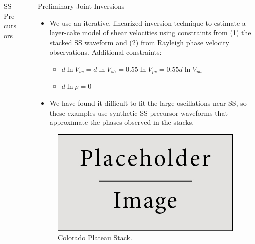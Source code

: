 \documentclass[final]{beamer}
\newlength{\sepwid}
\newlength{\onecolwid}
\newlength{\twocolwid}
\begin{document}
\begin{frame}[t]
\begin{columns}[t]
\begin{column}{\twocolwid}
\begin{columns}[t,totalwidth=\twocolwid]
\begin{column}{\onecolwid}
\begin{block}{SS Precursors}
\end{block}


\end{column} %

\end{columns} %

\end{column} %

\begin{column}{\sepwid}\end{column} %

\begin{column}{\onecolwid} %


\begin{block}{Preliminary Joint Inversions}

\begin{itemize}

\item We use an iterative, linearized inversion technique to estimate a layer-cake model of shear velocities using constraints from (1) the stacked SS waveform and (2) from Rayleigh phase velocity observations.  Additional constraints:

	\begin{itemize}

	\item $d \ln V_{sv} = d \ln V_{sh} = 0.55 \ln V_{pv} = 0.55 d \ln V_{ph}$
	\item $d \ln \rho = 0$

	\end{itemize}

\item We have found it difficult to fit the large oscillations near SS, so these examples use synthetic SS precursor waveforms that approximate the phases observed in the stacks.

\end{itemize}

\begin{figure}
\includegraphics{img/placeholder.jpg}
\caption{Colorado Plateau Stack.}
\end{figure}


\end{block}
\end{column}
\end{columns}
\end{frame}
\end{document}
